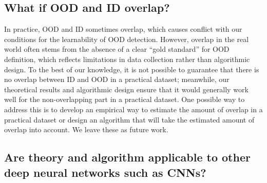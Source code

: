 \documentclass{article}
\theoremstyle{plain}
\theoremstyle{definition}
\theoremstyle{remark}
\begin{document}
\subsection{What if OOD and ID overlap?}
In practice, OOD and ID sometimes overlap, which causes conflict with our conditions for the learnability of OOD detection. However, overlap in the real world often stems from the absence of a clear ``gold standard” for OOD definition, which reflects limitations in data collection rather than algorithmic design. To the best of our knowledge, it is not possible to guarantee that there is no overlap between ID and OOD in a practical dataset; meanwhile, our theoretical results and algorithmic design ensure that it would generally work well for the non-overlapping part in a practical dataset. One possible way to address this is to develop an empirical way to estimate the amount of overlap in a practical dataset or design an algorithm that will take the estimated amount of overlap into account. We leave these as future work.

\subsection{Are theory and algorithm applicable to other deep neural networks such as CNNs?}
\end{document}
